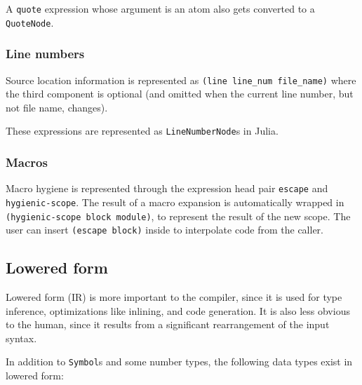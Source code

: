 A \texttt{quote} expression whose argument is an atom also gets converted to a \texttt{QuoteNode}.



\hypertarget{9438599814670899276}{}


\subsubsection{Line numbers}



Source location information is represented as \texttt{(line line\_num file\_name)} where the third component is optional (and omitted when the current line number, but not file name, changes).



These expressions are represented as \texttt{LineNumberNode}s in Julia.



\hypertarget{8143615541033323666}{}


\subsubsection{Macros}



Macro hygiene is represented through the expression head pair \texttt{escape} and \texttt{hygienic-scope}. The result of a macro expansion is automatically wrapped in \texttt{(hygienic-scope block module)}, to represent the result of the new scope. The user can insert \texttt{(escape block)} inside to interpolate code from the caller.



\hypertarget{16818744617880081407}{}


\subsection{Lowered form}



Lowered form (IR) is more important to the compiler, since it is used for type inference, optimizations like inlining, and code generation. It is also less obvious to the human, since it results from a significant rearrangement of the input syntax.



In addition to \texttt{Symbol}s and some number types, the following data types exist in lowered form:



